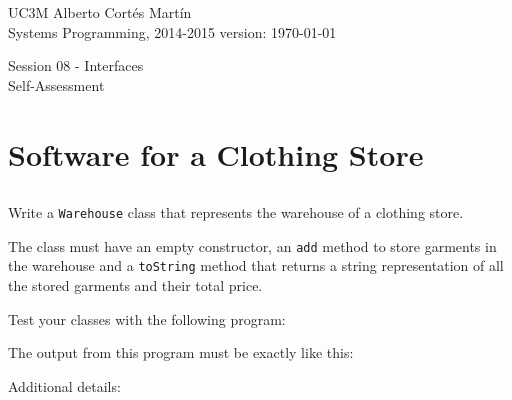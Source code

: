 \documentclass[a4paper, 11pt]{article}
\newcommand{\realtitle}{Session 08 - Interfaces}
\begin{document}
\makebox[\linewidth]{\rule{\textwidth}{0.4pt}}
UC3M \hfill Alberto Cortés Martín\\
Systems Programming, 2014-2015 \hfill version: \today\\
\makebox[\linewidth]{\rule{\textwidth}{0.4pt}}
\begin{center}
  \Large{\realtitle}\\Self-Assessment
\end{center}
\makebox[\linewidth]{\rule{\textwidth}{0.4pt}}
\vspace{1cm}


\section{Software for a Clothing Store}

\subsection{}

Write a \texttt{Warehouse} class that represents the warehouse of a clothing
store.

The class must have an empty constructor, an \texttt{add} method to store
garments in the warehouse and a \texttt{toString} method that returns a string
representation of all the stored garments and their total price.

Test your classes with the following program:


The output from this program must be exactly like this:


Additional details:
\end{document}
